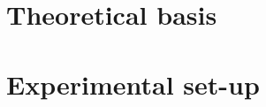 
\frontmatter





\tableofcontents*
{}  %
\newpage




\mainmatter
\chapter[An introduction to the theory]{Theoretical basis}







\chapter{Experimental set-up}

